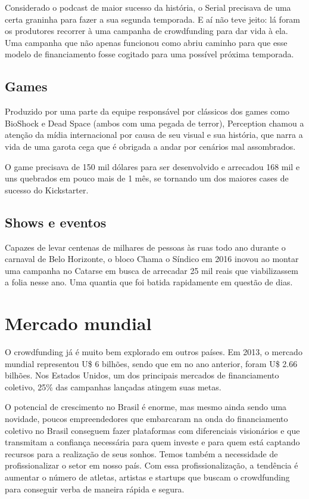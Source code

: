 \documentclass{classe_cn}                 %
\begin{document}
Considerado o podcast de maior sucesso da história, o Serial precisava de uma certa graninha para fazer a sua segunda temporada. E aí não teve jeito: lá foram os produtores recorrer à uma campanha de crowdfunding para dar vida à ela. Uma campanha que não apenas funcionou como abriu caminho para que esse modelo de financiamento fosse cogitado para uma possível próxima temporada.

\subsection{Games}

Produzido por uma parte da equipe responsável por clássicos dos games como BioShock e Dead Space (ambos com uma pegada de terror), Perception chamou a atenção da mídia internacional por causa de seu visual e sua história, que narra a vida de uma garota cega que é obrigada a andar por cenários mal assombrados.

O game precisava de 150 mil dólares para ser desenvolvido e arrecadou 168 mil e uns quebrados em pouco mais de 1 mês, se tornando um dos maiores cases de sucesso do Kickstarter.

\subsection{Shows e eventos}

Capazes de levar centenas de milhares de pessoas às ruas todo ano durante o carnaval de Belo Horizonte, o bloco Chama o Síndico em 2016 inovou ao montar uma campanha no Catarse em busca de arrecadar 25 mil reais que viabilizassem a folia nesse ano. Uma quantia que foi batida rapidamente em questão de dias.

\section{Mercado mundial}

O crowdfunding já é muito bem explorado em outros países. Em 2013, o mercado mundial representou U\$ 6 bilhões, sendo que em no ano anterior, foram U\$ 2.66 bilhões. Nos Estados Unidos, um dos principais mercados de financiamento coletivo, 25\% das campanhas lançadas atingem suas metas.

O potencial de crescimento no Brasil é enorme, mas mesmo ainda sendo uma novidade, poucos empreendedores que embarcaram na onda do financiamento coletivo no Brasil conseguem fazer plataformas com diferenciais visionários e que transmitam a confiança necessária para quem investe e para quem está captando recursos para a realização de seus sonhos. Temos também a necessidade de profissionalizar o setor em nosso país. Com essa profissionalização, a tendência é aumentar o número de atletas, artistas e startups que buscam o crowdfunding para conseguir verba de maneira rápida e segura.
\end{document}
